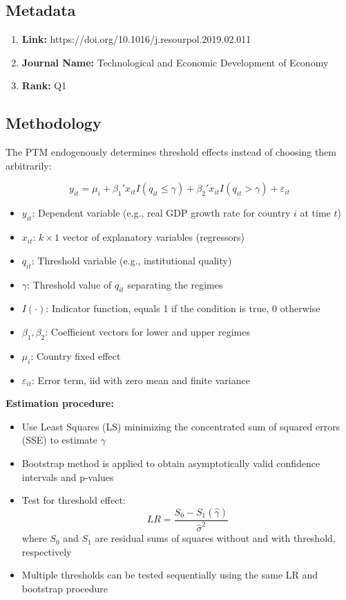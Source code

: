 \documentclass[10pt, oneside]{article}
\begin{document}
\subsection{Metadata}
\begin{enumerate}
	\item \textbf{Link:} https://doi.org/10.1016/j.resourpol.2019.02.011
	\item \textbf{Journal Name:} Technological and Economic Development of Economy
	\item \textbf{Rank:} Q1
\end{enumerate}

\subsection{Methodology}
The PTM endogenously determines threshold effects instead of choosing them arbitrarily:

\begin{equation}
	y_{it} = \mu_i + \beta_1' x_{it} I(q_{it} \leq \gamma) + \beta_2' x_{it} I(q_{it} > \gamma) + \varepsilon_{it}
\end{equation}

\begin{itemize}
	\item $y_{it}$: Dependent variable (e.g., real GDP growth rate for country $i$ at time $t$)
	\item $x_{it}$: $k \times 1$ vector of explanatory variables (regressors)
	\item $q_{it}$: Threshold variable (e.g., institutional quality)
	\item $\gamma$: Threshold value of $q_{it}$ separating the regimes
	\item $I(\cdot)$: Indicator function, equals 1 if the condition is true, 0 otherwise
	\item $\beta_1, \beta_2$: Coefficient vectors for lower and upper regimes
	\item $\mu_i$: Country fixed effect
	\item $\varepsilon_{it}$: Error term, iid with zero mean and finite variance
\end{itemize}

\textbf{Estimation procedure:}
\begin{itemize}
	\item Use Least Squares (LS) minimizing the concentrated sum of squared errors (SSE) to estimate $\gamma$
	\item Bootstrap method is applied to obtain asymptotically valid confidence intervals and p-values
	\item Test for threshold effect:
	      \begin{equation}
		      LR = \frac{S_0 - S_1(\hat{\gamma})}{\hat{\sigma}^2}
	      \end{equation}
	      where $S_0$ and $S_1$ are residual sums of squares without and with threshold, respectively
	\item Multiple thresholds can be tested sequentially using the same LR and bootstrap procedure
\end{itemize}
\end{document}
